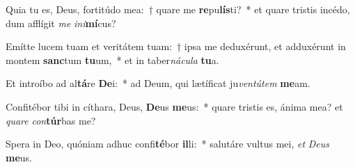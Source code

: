 \item Quia tu es, Deus, fortitúdo mea:~† quare me \textbf{re}pu\textbf{lís}ti?~* et quare tristis incédo, dum afflígit \textit{me} \textit{in}\textit{i}\textbf{mí}cus?
\item Emítte lucem tuam et veritátem tuam:~† ipsa me deduxérunt, et adduxérunt in montem \textbf{sanc}tum \textbf{tu}um,~* et in taber\textit{ná}\textit{cu}\textit{la} \textbf{tu}a.
\item Et introíbo ad al\textbf{tá}re \textbf{De}i:~* ad Deum, qui lætíficat ju\textit{ven}\textit{tú}\textit{tem} \textbf{me}am.
\item Confitébor tibi in cíthara, Deus, \textbf{De}us \textbf{me}us:~* quare tristis es, ánima mea? et \textit{qua}\textit{re} \textit{con}\textbf{túr}bas me?
\item Spera in Deo, quóniam adhuc confi\textbf{té}bor \textbf{il}li:~* salutáre vultus mei, \textit{et} \textit{De}\textit{us} \textbf{me}us.
